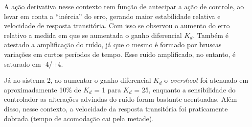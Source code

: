 
A ação derivativa nesse contexto tem função de antecipar a ação de controle, ao levar em conta a “inércia” do erro, gerando maior estabilidade relativa e velocidade de resposta transitória. Com isso se observou o aumento do erro relativo a medida em que se aumentada o ganho diferencial $K_d$. Também é atestado a amplificação do ruído, já que o mesmo é formado por bruscas variações em curtos períodos de tempo. Esse ruído amplificado, no entanto, é saturado em -4/+4.

Já no sistema 2, ao aumentar o ganho diferencial $K_d$ o \emph{overshoot} foi atenuado em aproximadamente 10\% de $K_d$ = 1 para $K_d$ = 25, enquanto a sensibilidade do controlador as alterações advindas do ruído foram bastante acentuadas. Além disso, nesse contexto, a velocidade da resposta transitória foi praticamente dobrada (tempo de acomodação cai pela metade).
